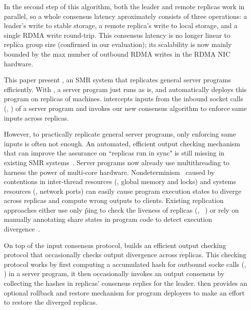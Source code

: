 In the second step of this algorithm, both the leader and remote replicas work 
in parallel, so a whole consensus latency aproximately consists of 
three operations: a leader's write to stable storage, a remote replica's write 
to local storage, and a single RDMA write round-trip. This consensus latency is 
no longer linear to replica group size (confirmed in our evaluation); its 
scalability is now mainly bounded by the max number of outbound RDMA writes in 
the RDMA NIC hardware.


This paper present \xxx, an SMR system that replicates general server programs 
efficiently. With \xxx, a server program just runs as is, and \xxx 
automatically deploys this program on replicas of machines. \xxx intercepts 
inputs from the inbound socket calls (\eg, \recv) of a server program and 
invokes our new consensus algorithm to enforce same inputs across replicas.


However, to practically replicate general server programs, only enforcing same 
inputs is often not enough. An automated, efficient output checking mechanism 
that can improve the assurance on ``replicas run in sync" is still missing in 
existing SMR 
systems~\cite{calvin:sigmod12,rex:eurosys14,crane:sosp15,dare:hpdc15}. Server 
programs now already use multithreading to harness the power of multi-core 
hardware. Nondeterminism~\cite{racepro:sosp11,dmp:asplos09,coredet:asplos10,
cui:tern:osdi10, kendo:asplos09,
dthreads:sosp11,peregrine:sosp11,parrot:sosp13,determinator:osdi10} caused by 
contentions in inter-thread resources (\eg, global memory and locks) and systems 
resources (\eg, network ports) can easily cause program execution states to 
diverge across replicas and compute wrong outputs to clients. Existing 
replication approaches either use only \v{ping} to check the liveness of 
replicas (\eg, \redis~\cite{redis}) or rely on manually annotating share states 
in program code to detect execution divergence~\cite{eve:osdi12}.

On top of the input consensus protocol, \xxx builds an efficient output 
checking protocol that occasionally checks output divergence across replicas. 
This checking protocol works by first computing a accumulated hash for outbound 
socke calls (\eg, \send) in a server program, it then occasionally invokes an 
output consensus by collecting the hashes in replicas' consensus replies for 
the leader. \xxx then provides an optional rollback and restore mechanism for 
program deployers to make an effort to restore the diverged replicas.


